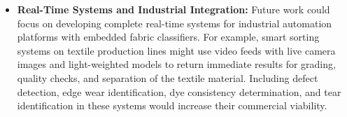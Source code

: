 \begin{itemize}
    \item \textbf{Real-Time Systems and Industrial Integration:} Future work could focus on developing complete real-time systems for industrial automation platforms with embedded fabric classifiers. For example, smart sorting systems on textile production lines might use video feeds with live camera images and light-weighted models to return immediate results for grading, quality checks, and separation of the textile material. Including defect detection, edge wear identification, dye consistency determination, and tear identification in these systems would increase their commercial viability.
\end{itemize}
